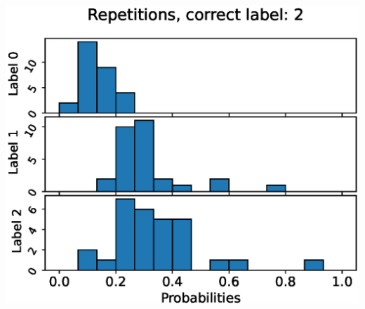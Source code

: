 \begin{center}
\begin{minipage}{0.33\textwidth}
  \includegraphics[width=\textwidth]{files/figs/app/hists/pelvis/r2.eps}
\end{minipage}


\end{center}
